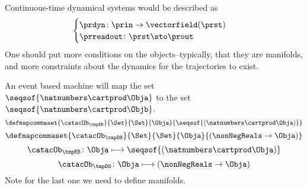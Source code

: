 Continuous-time dynamical systems would be described as
%
\begin{equation}
    \label{eq:continuous}
    \begin{cases}
        \prdyn\colon \prin \to \vectorfield(\prst) \\
        \prreadout\colon \prst \sto   \prout
    \end{cases}
\end{equation}
%
One should put more conditions on the objects--typically, that they are manifolds, and more constraints about the dynamics for the trajectories to exist.

An event based machine will map the set~$\seqsof{\natnumbers \cartprod \Obja}$ to the set~$\seqsof{\natnumbers \cartprod \Objb}$.
%
\begin{equation}
    \defmapcommaset{
        \catacOb_{\tmpEB}
    }{
        \Set
    }{
        \Set
    }{
        \Obja
    }{
        \seqsof{(\natnumbers \cartprod \Obja)}
    }
\end{equation}
%
\begin{equation}
    \defmapcommaset{
        \catacOb_{\tmpDS}
    }{
        \Set
    }{
        \Set
    }{
        \Obja
    }{
        (\nonNegReals \to \Obja)
    }
\end{equation}
%
\begin{equation}
    \label{eq:phi-EB}
    {\catacOb_{\tmpEB}}\colon{\Obja}\longmapsto{\seqsof{(\natnumbers \cartprod \Obja)}}
\end{equation}
%
\begin{equation}
    \label{eq:phi-DS}
    {\catacOb_{\tmpDS}}\colon{\Obja}\longmapsto{(\nonNegReals \to \Obja)}
\end{equation}
%
Note for the last one we need to define manifolds.
